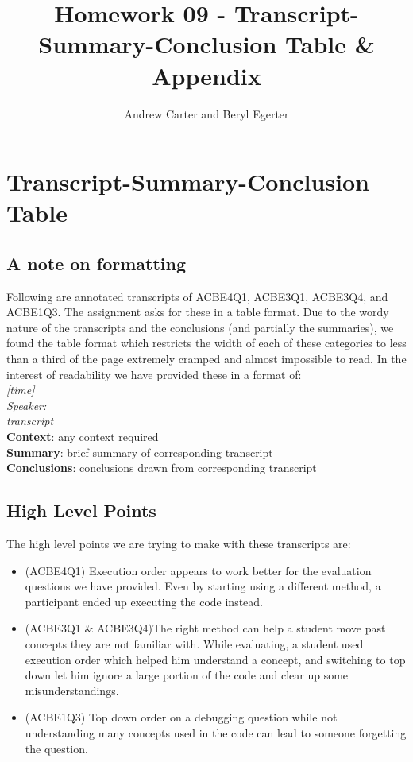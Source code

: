 \documentclass{article}
\title{Homework 09 - Transcript-Summary-Conclusion Table \& Appendix}
\author{Andrew Carter and Beryl Egerter}
\begin{document}
\maketitle

\section{Transcript-Summary-Conclusion Table}
\subsection{A note on formatting}
Following are annotated transcripts of ACBE4Q1, ACBE3Q1, ACBE3Q4, and ACBE1Q3. The assignment asks for these in a table format. Due to the wordy nature of the transcripts and the conclusions (and partially the summaries), we found the table format which restricts the width of each of these categories to less than a third of the page extremely cramped and almost impossible to read. In the interest of readability we have provided these in a format of: \\
\textit{[time] \\
Speaker:} \\
\hspace*{1em} \textit{transcript} \\
\textbf{Context}: any context required \\
\textbf{Summary}: brief summary of corresponding transcript \\
\textbf{Conclusions}: conclusions drawn from corresponding transcript 

\subsection{High Level Points}
The high level points we are trying to make with these transcripts are:
\begin{itemize}
  \item (ACBE4Q1) Execution order appears to work better for the evaluation questions we have provided. Even by starting using a different method, a participant ended up executing the code instead.
  \item (ACBE3Q1 \& ACBE3Q4)The right method can help a student move past concepts they are not familiar with. While evaluating, a student used execution order which helped him understand a concept, and switching to top down let him ignore a large portion of the code and clear up some misunderstandings.
  \item (ACBE1Q3) Top down order on a debugging question while not understanding many concepts used in the code can lead to someone forgetting the question.
\end{itemize}
\end{document}

